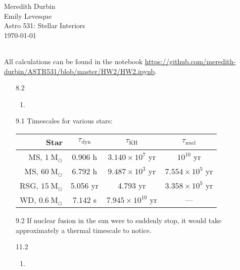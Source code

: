 \documentclass[11pt]{article}
\newcommand\msol{\mathrm{M}_\odot}
\begin{document}
\begin{flushright}Meredith Durbin\\
Emily Levesque\\
Astro 531: Stellar Interiors\\
\today\\

\end{flushright}

 \\[6pt]

All calculations can be found in the notebook \url{https://github.com/meredith-durbin/ASTR531/blob/master/HW2/HW2.ipynb}.

\begin{enumerate}

\item [8.2]
	\begin{enumerate}
	
    \item 
    
    \end{enumerate}

\item [9.1] Timescales for various stars:

    \begin{table}[H]
    \centering
    \begin{tabular}{ r | c | c | c }
      Star & $\tau_\mathrm{dyn}$ & $\tau_\mathrm{KH}$ & $\tau_\mathrm{nucl}$ \\ \hline
      MS, $1~\msol$ & 0.906 h & $3.140\times10^7$ yr & $10^{10}$ yr  \\
      MS, $60~\msol$ & 6.792 h & $9.487\times10^3$ yr & $7.554\times10^{5}$ yr  \\
      RSG, $15~\msol$ & 5.056 yr & 4.793 yr & $3.358\times10^{5}$ yr   \\
      WD, $0.6~\msol$ & 7.142 s & $7.945\times10^{10}$ yr & ---  \\
    \end{tabular}
    \end{table}

\item [9.2]
    If nuclear fusion in the sun were to suddenly stop, it would take approximately a thermal timescale to notice.

\item [11.2]
	\begin{enumerate}
	
    \item 
    

\end{enumerate}
\end{enumerate}
\end{document}
